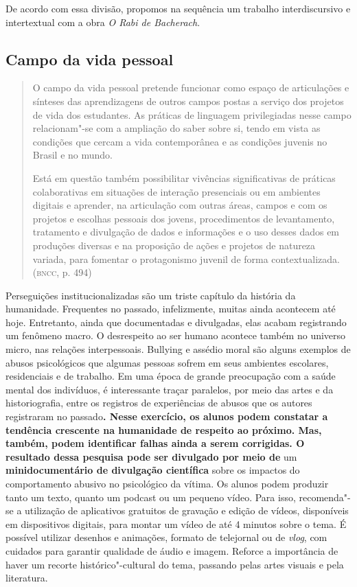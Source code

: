\documentclass[12pt]{extarticle}
\begin{document}
De acordo com essa divisão, propomos na sequência um trabalho
interdiscursivo e intertextual com a obra \emph{O Rabi de Bacherach}.

\subsection{Campo da vida pessoal}

\begin{quote}
O campo da vida pessoal pretende funcionar como espaço de articulações
e sínteses das aprendizagens de outros campos postas a serviço dos
projetos de vida dos estudantes. As práticas de linguagem privilegiadas
nesse campo relacionam"-se com a ampliação do saber sobre si, tendo em
vista as condições que cercam a vida contemporânea e as condições
juvenis no Brasil e no mundo.

Está em questão também possibilitar vivências significativas de práticas
colaborativas em situações de interação presenciais ou em ambientes
digitais e aprender, na articulação com outras áreas, campos e com os
projetos e escolhas pessoais dos jovens, procedimentos de levantamento,
tratamento e divulgação de dados e informações e o uso desses dados em
produções diversas e na proposição de ações e projetos de natureza
variada, para fomentar o protagonismo juvenil de forma
contextualizada. (\textsc{bncc}, p. 494)
\end{quote}

Perseguições institucionalizadas são um triste capítulo da história da
humanidade. Frequentes no passado, infelizmente, muitas ainda
acontecem até hoje. Entretanto, ainda que documentadas e divulgadas,
elas acabam registrando um fenômeno macro. O desrespeito ao ser humano
acontece também no universo micro, nas relações interpessoais.
Bullying e assédio moral são alguns exemplos de abusos psicológicos
que algumas pessoas sofrem em seus ambientes escolares, residenciais e
de trabalho. Em uma época de grande preocupação com a saúde mental dos
indivíduos, é interessante traçar paralelos, por meio das artes e da
historiografia, entre os registros de experiências de abusos que os
autores registraram no passado\textbf{. Nesse exercício, os alunos
podem constatar a tendência crescente na humanidade de respeito ao
próximo. Mas, também, podem identificar falhas ainda a serem
corrigidas. O resultado dessa pesquisa pode ser divulgado por meio de}
um \textbf{minidocumentário de divulgação científica} sobre os
impactos do comportamento abusivo no psicológico da vítima. Os alunos
podem produzir tanto um texto, quanto um podcast ou um pequeno vídeo.
Para isso, recomenda"-se a utilização de aplicativos gratuitos de
gravação e edição de vídeos, disponíveis em dispositivos digitais,
para montar um vídeo de até 4 minutos sobre o tema. É possível
utilizar desenhos e animações, formato de telejornal ou de
\emph{vlog}, com cuidados para garantir qualidade de áudio e imagem.
Reforce a importância de haver um recorte histórico"-cultural do tema,
passando pelas artes visuais e pela literatura.
\end{document}
